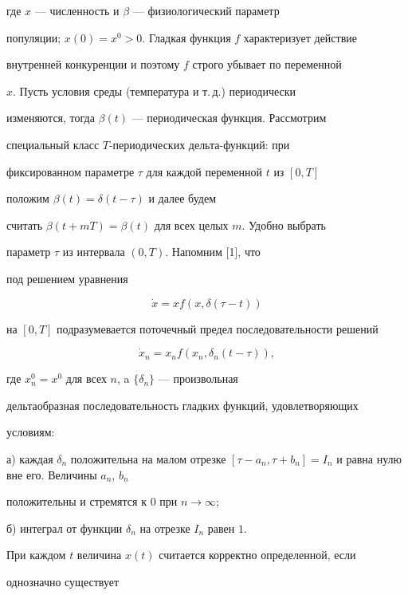 где $x$ --- численность и $\beta$ --- физиологический параметр 


популяции; $x(0)=x^0>0$. Гладкая функция $f$ характеризует действие 


внутренней конкуренции и поэтому $f$ строго убывает по переменной 


$x$. Пусть условия среды (температура и т.\,д.) периодически 


изменяются, тогда $\beta(t)$ --- периодическая функция. Рассмотрим 


специальный класс $T$-периодических дельта-функций: при 


фиксированном параметре $\tau$ для каждой переменной $t$ из $[0,T]$ 


положим $\beta(t)=\delta(t-\tau)$ и далее будем 


считать $\beta(t+mT)=\beta(t)$ для всех целых $m$. Удобно выбрать 


параметр $\tau$ из интервала $(0,T)$. Напомним [1], что 


под решением уравнения


$$


\Dot x=xf(x,\delta(\tau-t))


$$


на $[0,T]$ подразумевается поточечный предел последовательности решений


$$


\Dot x_n=x_nf(x_n,\delta_n(t-\tau)),


$$


где $x_n^0=x^0$ для всех $n$, a $\{\delta_n\}$ --- произвольная 


дельтаобразная последовательность гладких функций, удовлетворяющих 


условиям:





а) каждая $\delta_n$ положительна на малом отрезке $[\tau-a_n,


\tau+b_n]=I_n$ и равна нулю вне его. Величины $a_n$, $b_n$ 


положительны и стремятся к $0$ при $n\to\infty$;





б) интеграл от функции $\delta_n$ на отрезке $I_n$ равен $1$.





При каждом $t$ величина $x(t)$ считается корректно определенной, если


однозначно существует


